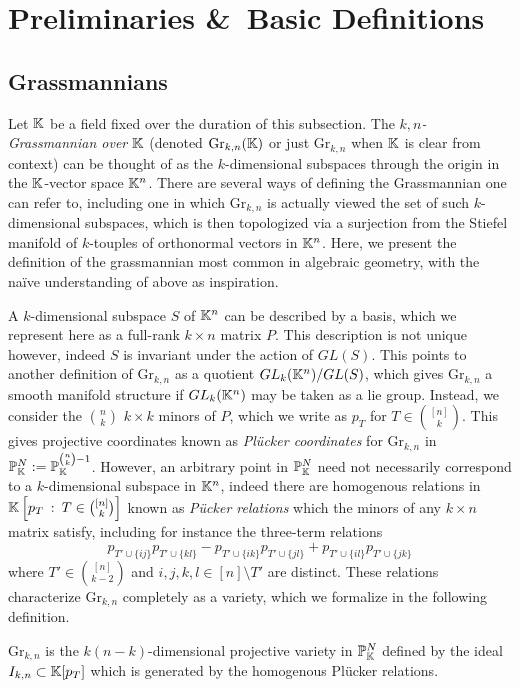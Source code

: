 \documentclass[12pt,letter]{article}
\newcommand{\gr}{\mathrm{Gr}}
\begin{document}
\section{Preliminaries \&~Basic Definitions}

\subsection{Grassmannians}
Let ${\mathbb K}$ be a field fixed over the duration of this subsection. The \emph{$k,n$-Grassmannian over ${\mathbb K}$} (denoted $\gr_{k,n}(\KK)$ or just $\gr_{k,n}$ when ${\mathbb K}$ is clear from context) can be thought of as the $k$-dimensional subspaces through the origin in the ${\mathbb K}$-vector space ${\mathbb K}^n$. There are several ways of defining the Grassmannian one can refer to, including one \cite[\S1.2]{khat} in which $\gr_{k,n}$ is actually viewed the set of such $k$-dimensional subspaces, which is then topologized via a surjection from the Stiefel manifold of $k$-touples of orthonormal vectors in ${\mathbb K}^n$. Here, we present the definition of the grassmannian most common in algebraic geometry,
with the na\"ive understanding of above as inspiration.

A $k$-dimensional subspace $S$ of ${\mathbb K}^n$ can be described by a basis, which we represent here as a full-rank $k\times n$ matrix $P$. This description is not unique however, indeed $S$ is invariant under the action of $GL(S)$. This points to another definition of $\gr_{k,n}$ as a quotient $GL_k({\mathbb K}^n)/GL(S)$, which gives $\gr_{k,n}$ a smooth manifold structure if $GL_k({\mathbb K}^n)$ may be taken as a lie group. Instead, we consider the $n\choose k$ $k\times k$ minors of $P$, which we write as $p_{T}$ for $T\in {[n]\choose k}$. This gives projective coordinates known as \emph{Pl\"ucker coordinates} for $\gr_{k,n}$ in ${\mathbb P}_{\mathbb K}^N:={\mathbb P}_{{\mathbb K}}^{{n\choose k}-1}$. However, an arbitrary point in ${\mathbb P}_{\mathbb K}^N$ need not necessarily correspond to a $k$-dimensional subspace in ${\mathbb K}^n$, indeed there are homogenous relations in ${\mathbb K}\left[p_T\::\:T\in {[n]\choose k}\right]$ known as \emph{P\"ucker relations} which the minors of any $k\times n$ matrix satisfy, including for instance the three-term relations $$p_{T'\cup\{ij\}}p_{T'\cup\{kl\}}-p_{T'\cup\{ik\}}p_{T'\cup\{jl\}}+p_{T'\cup\{il\}}p_{T'\cup\{jk\}}$$
where $T'\in {[n]\choose k-2}$ and $i,j,k,l\in [n]\setminus T'$ are distinct. These relations characterize $\gr_{k,n}$ completely as a variety, which we formalize in the following definition.
\begin{definition}
	$\gr_{k,n}$ is the $k(n-k)$-dimensional projective variety in ${\mathbb P}_{{\mathbb K}}^{N}$ defined by the ideal  $I_{k,n}\subset {\mathbb K}[p_T]$ which is generated by the homogenous Pl\"ucker relations.
\end{definition}
\end{document}
